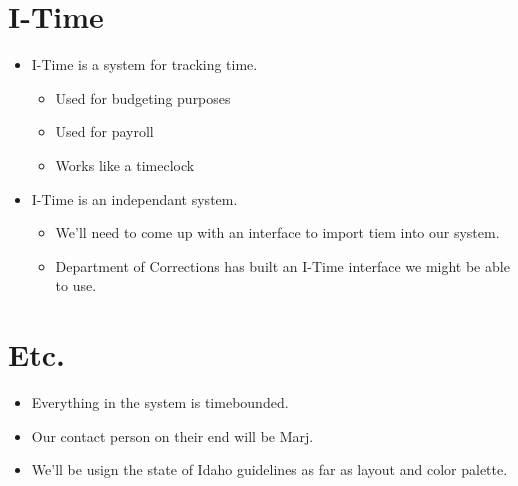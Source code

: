 \documentclass{article}
\begin{document}
\section{I-Time}
\begin{itemize}
\item I-Time is a system for tracking time.
	\begin{itemize}
	\item Used for budgeting purposes
	\item Used for payroll
	\item Works like a timeclock
	\end{itemize}
\item I-Time is an independant system.
	\begin{itemize}
	\item We'll need to come up with an interface to import tiem into our system.
	\item Department of Corrections has built an I-Time interface we might be able to use.
	\end{itemize}
\end{itemize}

\section{Etc.}
\begin{itemize}
\item Everything in the system is timebounded.
\item Our contact person on their end will be Marj.
\item We'll be usign the state of Idaho guidelines as far as layout and color palette.
\end{itemize}
\end{document}
